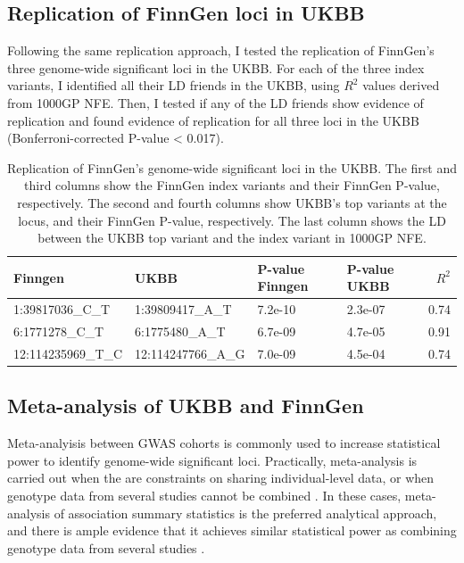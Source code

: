   \subsection{Replication of FinnGen loci in UKBB}
  Following the same replication approach, I tested the replication of FinnGen's three genome-wide significant loci in the UKBB. For each of the three index variants, I identified all their LD friends in the UKBB, using $R^{2}$ values derived from 1000GP NFE. Then, I tested if any of the LD friends show evidence of replication and  found evidence of replication for all three loci in the UKBB (Bonferroni-corrected P-value < 0.017).

  \begin{table}[H]
    \caption{Replication of FinnGen's genome-wide significant loci in the UKBB. The first and third columns show the FinnGen index variants and their FinnGen P-value, respectively. The second and fourth columns show UKBB's top variants at the locus, and their FinnGen P-value, respectively. The last column shows the LD between the UKBB top variant and the index variant in 1000GP NFE.}
    \label{table:replication_finngen_in_ukbb}
    \centering
    \begin{tabular}[t]{llllr}
    \toprule
    Finngen & UKBB & P-value Finngen & P-value UKBB & $R^{2}$\\
    \midrule
    1:39817036\_C\_T & 1:39809417\_A\_T & 7.2e-10 & 2.3e-07 & 0.74\\
    6:1771278\_C\_T & 6:1775480\_A\_T & 6.7e-09 & 4.7e-05 & 0.91\\
    12:114235969\_T\_C & 12:114247766\_A\_G & 7.0e-09 & 4.5e-04 & 0.74\\
    \bottomrule
    \end{tabular}
    \end{table}


    \subsection{Meta-analysis of UKBB and FinnGen}
    Meta-analyisis between GWAS cohorts is commonly used to increase statistical power to identify genome-wide significant loci. Practically, meta-analysis is carried out when the are constraints on sharing individual-level data, or when genotype data from several studies cannot be combined \cite{Evangelou2013-rn}. In these cases, meta-analysis of association summary statistics is the preferred analytical approach, and there is ample evidence that it achieves similar statistical power as combining genotype data from several studies \cite{metal_docs}. \\

